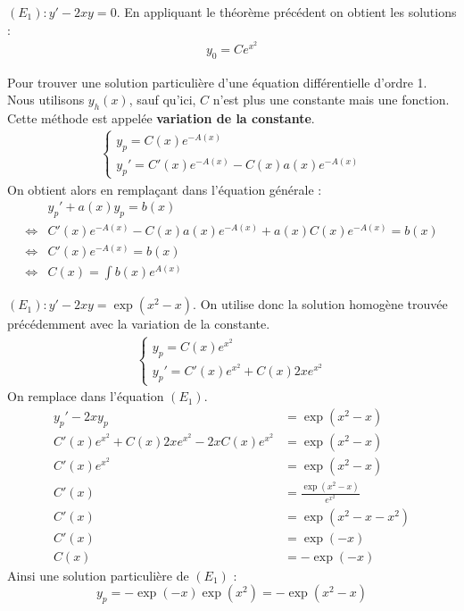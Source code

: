 \begin{example}
    $(E_1) : y' - 2xy = 0$.
    En appliquant le théorème précédent on obtient les solutions :
    \begin{align*}
        y_0 = Ce^{x^2}
    \end{align*}
\end{example}

Pour trouver une solution particulière d'une équation différentielle d'ordre 1. Nous utilisons $y_{h}(x)$, sauf qu'ici, $C$ n'est plus une constante mais une fonction. Cette méthode est appelée \textbf{variation de la constante}.
    \begin{align*}
        \begin{cases}
            y_{p} = C(x)e^{-A(x)} \\
            y_{p}' = C'(x)e^{-A(x)} - C(x)a(x)e^{-A(x)}
        \end{cases}
    \end{align*}
    On obtient alors en remplaçant dans l'équation générale :
    \begin{align*}
        &y_{p}' + a(x) y_{p} = b(x) \\
        \iff &C'(x)e^{-A(x)} - C(x)a(x) e^{-A(x)} + a(x)C(x)e^{-A(x)} = b(x) \\
        \iff &C'(x) e^{-A(x)} = b(x) \\
        \iff &C(x) = \int b(x) e^{A(x)}
    \end{align*}

\begin{example}
    $(E_1) : y' - 2xy = \exp(x^2 - x)$.
    On utilise donc la solution homogène trouvée précédemment avec la variation de la constante.
    \begin{align*}
        \begin{cases}
            y_p = C(x) e^{x^2} \\ 
            y_p' = C'(x) e^{x^2} + C(x)2x e^{x^2}
        \end{cases}
    \end{align*}
    On remplace dans l'équation $(E_1)$.
    \begin{align*}
        y_p' - 2x y_p &= \exp(x^2 - x) \\
        C'(x) e^{x^2} + C(x)2x e^{x^2} - 2x C(x)e^{x^2} &= \exp(x^2 - x) \\
        C'(x)e^{x^2} &= \exp(x^2 - x) \\ 
        C'(x) &= \frac{\exp(x^2 - x)}{e^{x^2}} \\
        C'(x) &= \exp(x^2 - x - x^2) \\
        C'(x) &= \exp(-x) \\
        C(x) &= -\exp(-x)
    \end{align*}
    Ainsi une solution particulière de $(E_1)$ :
    \[ y_p = -\exp(-x) \exp(x^2) = -\exp(x^2 - x) \]
\end{example}

